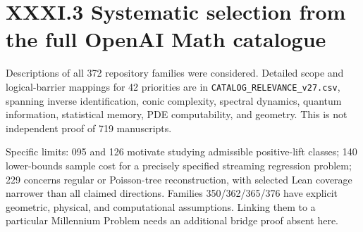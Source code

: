 \documentclass[11pt,a4paper,oneside]{book}
\begin{document}
\section*{XXXI.3 Systematic selection from the full OpenAI Math catalogue}
Descriptions of all 372 repository families were considered. Detailed scope and logical-barrier mappings for 42 priorities are in \texttt{CATALOG\_RELEVANCE\_v27.csv}, spanning inverse identification, conic complexity, spectral dynamics, quantum information, statistical memory, PDE computability, and geometry. This is not independent proof of 719 manuscripts.

Specific limits: 095 and 126 motivate studying admissible positive-lift classes; 140 lower-bounds sample cost for a precisely specified streaming regression problem; 229 concerns regular or Poisson-tree reconstruction, with selected Lean coverage narrower than all claimed directions. Families 350/362/365/376 have explicit geometric, physical, and computational assumptions. Linking them to a particular Millennium Problem needs an additional bridge proof absent here.
\end{document}
